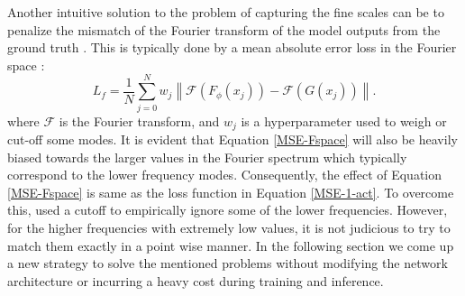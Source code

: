 Another intuitive solution to the problem of capturing the fine scales can be to penalize the mismatch of the Fourier transform of the model outputs from the ground truth \citep{chattopadhyay2024oceannet,guan2024lucie,kochkov2023neural}. This is typically done by a mean absolute error loss in the Fourier space :
\begin{equation}\label{MSE-Fspace}
L_f = \frac{1}{N}\sum_{j=0}^Nw_j \left\|\mathcal{F}(F_{\phi}(x_j)) - \mathcal{F}(G(x_j))\right\|.
\end{equation}
where $\mathcal{F}$ is the Fourier transform, and $w_j$ is a hyperparameter used to weigh or cut-off some modes. 
It is evident that Equation \ref{MSE-Fspace} will also be heavily biased towards the larger values in the Fourier spectrum which typically correspond to the lower frequency modes. Consequently, the effect of Equation \ref{MSE-Fspace} is same as the loss function in Equation \ref{MSE-1-act}. To overcome this, \citep{chattopadhyay2024oceannet} used a cutoff to empirically ignore some of the lower frequencies. However, for the higher frequencies with extremely low values, it is not judicious to try to match them exactly in a point wise manner. In the following section we come up a new strategy to solve the mentioned problems without modifying the network architecture or incurring a heavy cost during training and inference.